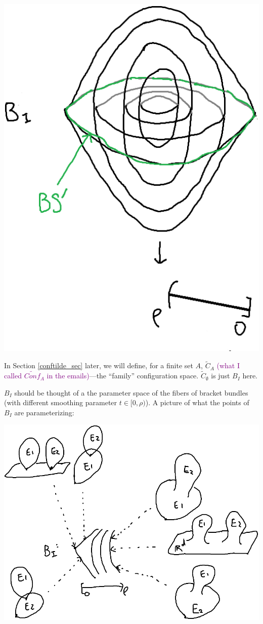 \documentclass[11pt]{article}
\theoremstyle{definition}
\theoremstyle{remark}
\def\wt#1{\widetilde{#1}}
\def\cmt#1{\textcolor{purple}{(#1)}}
\begin{document}
\includegraphics[scale=0.5]{BI_fig} 


In Section \ref{conftilde_sec} later, we will define, for a finite set $A$, $\wt{C}_A$ \cmt{what I called $\wt{Conf}_A$ in the emails}---the ``family'' configuration space. 
$\wt{C}_\emptyset$ is just $B_I$ here. 



$B_I$ should be thought of a the parameter space of the fibers of bracket bundles (with different smoothing parameter $t\in[0,\rho)$). A picture of what the points of $B_I$ are parameterizing:

\includegraphics[scale=0.5]{EI_fig} 
\end{document}
